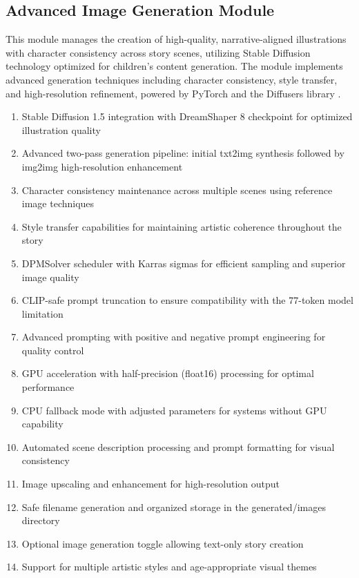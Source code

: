 \subsection{Advanced Image Generation Module}
This module manages the creation of high-quality, narrative-aligned illustrations with character consistency across story scenes, utilizing Stable Diffusion technology \cite{rombach2022highresolution} optimized for children's content generation. The module implements advanced generation techniques including character consistency, style transfer, and high-resolution refinement, powered by PyTorch \cite{pytorch2024} and the Diffusers library \cite{diffusers2024}.
\begin{enumerate}
    \item Stable Diffusion 1.5 integration with DreamShaper 8 checkpoint for optimized illustration quality
    \item Advanced two-pass generation pipeline: initial txt2img synthesis followed by img2img high-resolution enhancement
    \item Character consistency maintenance across multiple scenes using reference image techniques
    \item Style transfer capabilities for maintaining artistic coherence throughout the story
    \item DPMSolver scheduler with Karras sigmas for efficient sampling and superior image quality
    \item CLIP-safe prompt truncation to ensure compatibility with the 77-token model limitation
    \item Advanced prompting with positive and negative prompt engineering for quality control
    \item GPU acceleration with half-precision (float16) processing for optimal performance
    \item CPU fallback mode with adjusted parameters for systems without GPU capability
    \item Automated scene description processing and prompt formatting for visual consistency
    \item Image upscaling and enhancement for high-resolution output
    \item Safe filename generation and organized storage in the generated/images directory
    \item Optional image generation toggle allowing text-only story creation
    \item Support for multiple artistic styles and age-appropriate visual themes
\end{enumerate}

